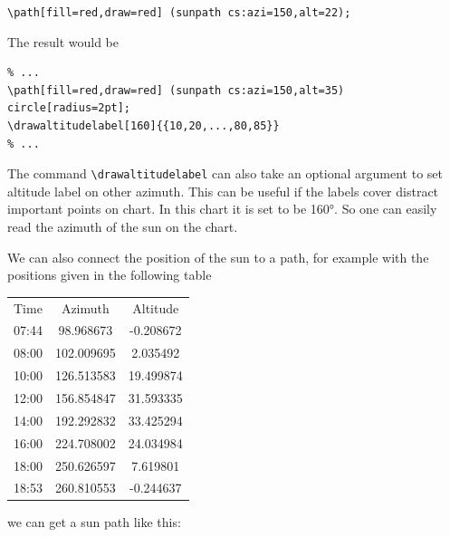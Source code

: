 \verb|\path[fill=red,draw=red] (sunpath cs:azi=150,alt=22);|

The result would be

\begin{verbatim}
% ...
\path[fill=red,draw=red] (sunpath cs:azi=150,alt=35) circle[radius=2pt];
\drawaltitudelabel[160]{{10,20,...,80,85}}
% ...
\end{verbatim}


The command \verb:\drawaltitudelabel: can also take an optional argument to set altitude label on other azimuth.
This can be useful if the labels cover distract important points on chart.
In this chart it is set to be 160°. So one can easily read the azimuth of the sun on the chart.

We can also connect the position of the sun to a path, for example with the positions given in the following table

{\ttfamily
\begin{tabular}{c  c  c}
Time  & Azimuth    & Altitude  \\
07:44 &  98.968673 & -0.208672 \\
08:00 & 102.009695 &  2.035492 \\
10:00 & 126.513583 & 19.499874 \\
12:00 & 156.854847 & 31.593335 \\
14:00 & 192.292832 & 33.425294 \\
16:00 & 224.708002 & 24.034984 \\
18:00 & 250.626597 &  7.619801 \\
18:53 & 260.810553 & -0.244637 \\
\end{tabular}
}

we can get a sun path like this:


